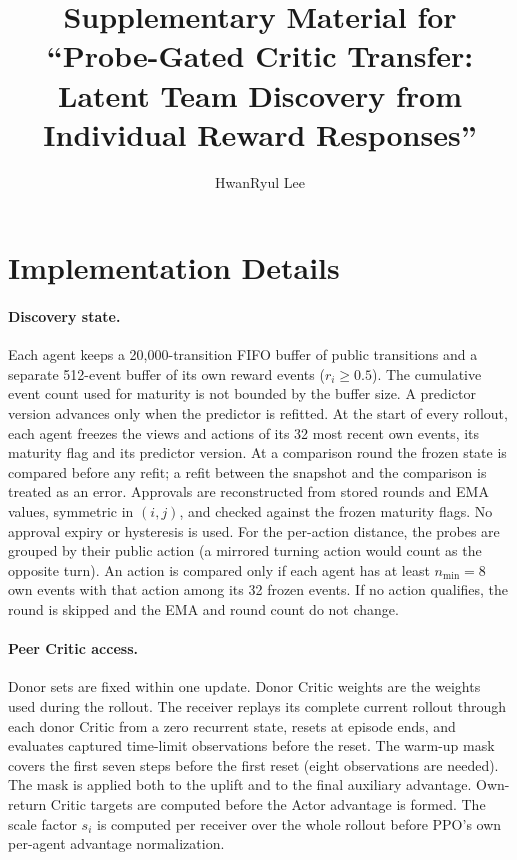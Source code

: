 \documentclass[10pt]{article}
\title{Supplementary Material for\\``Probe-Gated Critic Transfer: Latent Team Discovery from Individual Reward Responses''}
\author{HwanRyul Lee}
\date{}
\begin{document}
\maketitle

\section{Implementation Details}
\paragraph{Discovery state.} Each agent keeps a 20{,}000-transition FIFO buffer of public transitions and a separate 512-event buffer of its own reward events ($r_i\ge0.5$). The cumulative event count used for maturity is not bounded by the buffer size. A predictor version advances only when the predictor is refitted. At the start of every rollout, each agent freezes the views and actions of its 32 most recent own events, its maturity flag and its predictor version. At a comparison round the frozen state is compared before any refit; a refit between the snapshot and the comparison is treated as an error. Approvals are reconstructed from stored rounds and EMA values, symmetric in $(i,j)$, and checked against the frozen maturity flags. No approval expiry or hysteresis is used. For the per-action distance, the probes are grouped by their public action (a mirrored turning action would count as the opposite turn). An action is compared only if each agent has at least $n_{\min}=8$ own events with that action among its 32 frozen events. If no action qualifies, the round is skipped and the EMA and round count do not change.

\paragraph{Peer Critic access.} Donor sets are fixed within one update. Donor Critic weights are the weights used during the rollout. The receiver replays its complete current rollout through each donor Critic from a zero recurrent state, resets at episode ends, and evaluates captured time-limit observations before the reset. The warm-up mask covers the first seven steps before the first reset (eight observations are needed). The mask is applied both to the uplift and to the final auxiliary advantage. Own-return Critic targets are computed before the Actor advantage is formed. The scale factor $s_i$ is computed per receiver over the whole rollout before PPO's own per-agent advantage normalization.
\end{document}
